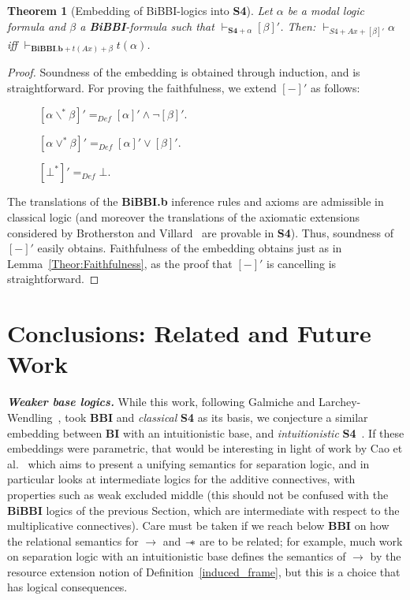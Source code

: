 \documentclass[a4paper]{article}
\newtheorem{theorem}{Theorem}[section]
\newcommand\magicwand{\mathrel{-\mkern-6mu*}}
\newcommand{\BBI}{\textbf{BBI}\xspace}
\newcommand{\SFour}{\textbf{S4}\xspace}
\newcommand{\rev}[1]{[#1]'}
\begin{document}
\begin{theorem}[Embedding of BiBBI-logics into \SFour]\label{Theor:Embedding_BiBBI} Let $\alpha$ be a modal logic formula and $\beta$ a \textbf{BiBBI}-formula such that $\vdash_{\SFour + \alpha}[\beta]'$. Then: $\vdash_{S4+Ax+[\beta]'} \alpha$ iff $\vdash_{\textbf{BiBBI.b}+t(Ax)+\beta} t(\alpha)$.     

\end{theorem}
\begin{proof}
    Soundness of the embedding is obtained through induction, and is straightforward. For proving the faithfulness, we extend $\rev{-}$ as follows:

\begin{description}


    \item[] $[\alpha \backslash^* \beta]'=_{Def} [\alpha]' \land \neg [\beta]'$.

    \item[] $[\alpha \lor^* \beta]'=_{Def} [\alpha]' \lor  [\beta]'$.

    \item[]  $[\bot^*]'=_{Def} \bot$.
    
\end{description}

 The translations of the \textbf{BiBBI.b} inference rules and axioms are admissible in classical logic (and moreover the translations of the axiomatic extensions considered by Brotherston and Villard~\cite{intermediateBBI} are provable in \SFour). Thus, soundness of $\rev{-}$ easily obtains. Faithfulness of the embedding obtains just as in Lemma~\ref{Theor:Faithfulness}, as the proof that $\rev{-}$ is cancelling is straightforward.

\end{proof}

\section{Conclusions: Related and Future Work}
\label{Sec:conc}

\textbf{\emph{Weaker base logics.}} While this work, following Galmiche and Larchey-Wendling~\cite{galmiche_expressivity_2006}, took \BBI and \emph{classical} \SFour as its basis, we conjecture a similar embedding between \textbf{BI} with an intuitionistic base, and \emph{intuitionistic} \SFour~\cite{Simpson94}.
If these embeddings were parametric, that would be interesting in light of work by Cao et al.~\cite{Bringing_order} which aims to present a unifying semantics for separation logic, and in particular looks at intermediate logics for the additive connectives, with properties such as weak excluded middle
(this should not be confused with the \textbf{BiBBI} logics of the previous Section, which are intermediate with respect to the multiplicative connectives).
Care must be taken if we reach below \BBI on how the relational semantics for $\to$ and $\magicwand$ are to be related; for example, much work on separation logic with an intuitionistic base defines the semantics of $\to$ by the resource extension notion of Definition~\ref{induced_frame}, but this is a choice that has logical consequences.
\end{document}
